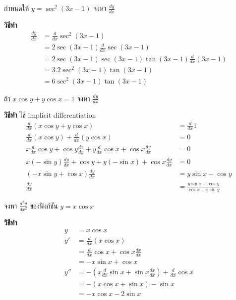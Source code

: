 \documentclass[
]{book}
\begin{document}
กำหนดให้ \(y=\sec^{2}(3x-1)\) จงหา \(\displaystyle
\frac{dy}{dx}\)

\textbf{วิธีทำ} \begin{equation}   \begin{aligned}
\displaystyle \frac{dy}{dx}&=\frac{d}{dx}\sec^{2}(3x-1)\\
&=2\sec(3x-1)\displaystyle \frac{d}{dx}\sec(3x-1)\\
&=2\sec(3x-1)\sec(3x-1)\tan(3x-1)\displaystyle \frac{d}{dx}(3x-1)\\
&=3.2\sec^{2}(3x-1)\tan(3x-1)\\
&=6\sec^{2}(3x-1)\tan(3x-1)
  \end{aligned} \end{equation}

ถ้า \(x\cos y+y\cos x=1\) จงหา \(\displaystyle \frac{dy}{dx}\)

\textbf{วิธีทำ} ใช้ implicit differentiation
\begin{equation}   \begin{aligned}
\displaystyle \frac{d}{dx}(x\cos y +y\cos x)&=\frac{d}{dx}1\\
\displaystyle \frac{d}{dx}(x\cos y)+\frac{d}{dx}(y\cos x)&=0\\
\displaystyle x\frac{d}{dx}\cos y+\cos y \frac{dx}{dy}+y\frac{d}{dx}\cos
x+\cos x\frac{dy}{dx}&=0\\
\displaystyle x(-\sin y)\frac{dy}{dx}+\cos y + y(-\sin x)+\cos
x\frac{dy}{dx}&=0\\
\displaystyle (-x\sin y+\cos x)\frac{dy}{dx}&=y\sin x -\cos y\\
\displaystyle \frac{dy}{dx}&=\frac{y\sin x-\cos y}{\cos x-x\sin y}
  \end{aligned} \end{equation}

จงหา \(\displaystyle \frac{d^{2}y}{dx^{2}}\) ของฟังก์ชัน \(y=
x\cos x\)

\textbf{วิธีทำ} \begin{equation}   \begin{aligned}
y&= x\cos x\\
\displaystyle y'&=\frac{d}{dx}(x\cos x)\\
&=\displaystyle \frac{d}{dx}\cos x +\cos x\frac{dx}{dx}\\
&=-x\sin x + \cos x\\
\displaystyle y''&=-(x\frac{d}{dx}\sin x + \sin x\frac{dx}{dx}) +
\frac{d}{dx}\cos x \\
&=-(x\cos x + \sin x)-\sin x\\
&=-x\cos x - 2\sin x
  \end{aligned} \end{equation}
\end{document}

